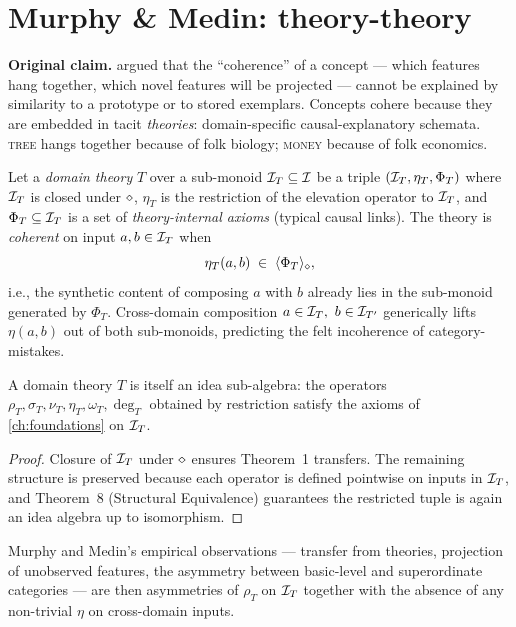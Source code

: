 \section{Murphy \& Medin: theory-theory}\label{sec:cogsci-theorytheory}

\textbf{Original claim.} \citet{MurphyMedin1985} argued that the
``coherence'' of a concept --- which features hang together, which novel
features will be projected --- cannot be explained by similarity to a
prototype or to stored exemplars. Concepts cohere because they are embedded
in tacit \emph{theories}: domain-specific causal-explanatory schemata.
\textsc{tree} hangs together because of folk biology; \textsc{money}
because of folk economics.

\formalclaim Let a \emph{domain theory} $T$ over a sub-monoid
$\mathcal{I}_T\subseteq\mathcal{I}$ be a triple $(\mathcal{I}_T,\eta_T,\Phi_T)$ where
$\mathcal{I}_T$ is closed under $\mathbin{\diamond}$, $\eta_T$ is the restriction of the
elevation operator to $\mathcal{I}_T$, and $\Phi_T\subseteq\mathcal{I}_T$ is a set
of \emph{theory-internal axioms} (typical causal links). The theory is
\emph{coherent} on input $a,b\in\mathcal{I}_T$ when
\[
  \eta_T(a,b)\;\in\;\langle\Phi_T\rangle_{\mathbin{\diamond}},
\]
i.e., the synthetic content of composing $a$ with $b$ already lies in the
sub-monoid generated by $\Phi_T$. Cross-domain composition
$a\in\Ideas_T,\ b\in\Ideas_{T'}$ generically lifts $\eta(a,b)$ out of both
sub-monoids, predicting the felt incoherence of category-mistakes.

\begin{corollary}\label{cor:cogsci-theory}
A domain theory $T$ is itself an idea sub-algebra: the operators
$\rho_T,\sigma_T,\nu_T,\eta_T,\omega_T,\deg_T$ obtained by restriction
satisfy the axioms of \cref{ch:foundations} on $\mathcal{I}_T$.
\end{corollary}

\begin{proof}
Closure of $\mathcal{I}_T$ under $\mathbin{\diamond}$ ensures Theorem~1 transfers. The
remaining structure is preserved because each operator is defined
pointwise on inputs in $\mathcal{I}_T$, and Theorem~8 (Structural Equivalence)
guarantees the restricted tuple is again an idea algebra up to
isomorphism.
\end{proof}

Murphy and Medin's empirical observations --- transfer from theories,
projection of unobserved features, the asymmetry between basic-level and
superordinate categories --- are then asymmetries of $\rho_T$ on $\mathcal{I}_T$
together with the absence of any non-trivial $\eta$ on cross-domain inputs.

